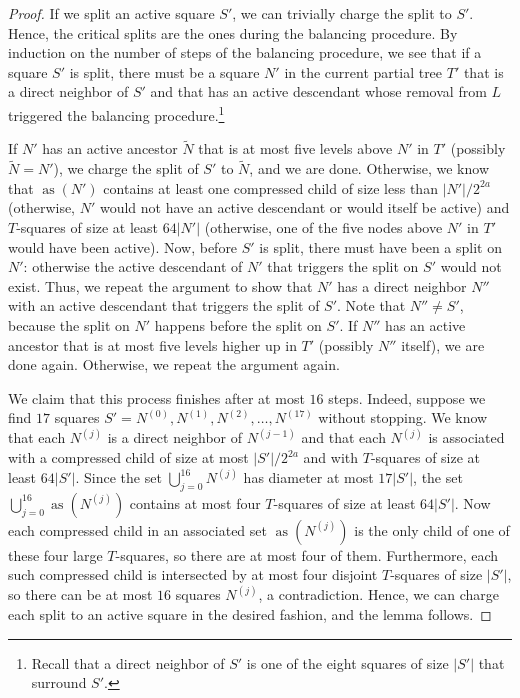 \documentclass[11pt]{paper}
\DeclareMathOperator {\as}{as}
\begin{document}
      \begin{proof}
      If we split an active square $S'$, we can trivially
      charge the split to $S'$.
      Hence, the critical splits
      are the ones during the balancing procedure. 
      By induction on the number of steps of the balancing
      procedure, we see that if a square $S'$ is split, there must be 
      a square $N'$ in the current partial tree $T'$ that is a direct 
      neighbor of $S'$ and that has an active descendant whose 
      removal from $L$  triggered the
      balancing procedure.\footnote{Recall that a direct neighbor
      of $S'$ is one of the eight squares of size $|S'|$ that surround
      $S'$.}

      If $N'$ has an active ancestor $\widetilde{N}$ that is at 
      most five levels above $N'$ in $T'$ (possibly $\widetilde{N} = N'$), 
      we charge the split of $S'$ to
      $\widetilde{N}$, and we are done. Otherwise, we know that
      $\as(N')$ contains at least one compressed child of
      size less than $|N'|/2^{2a}$ (otherwise, $N'$ would not
      have an active descendant or would itself be active) 
      and $T$-squares of size at least
      $64|N'|$ (otherwise, one of the five nodes above $N'$ in $T'$ 
      would have been active). Now, before $S'$ is split, there
      must have been a split on $N'$: otherwise the
      active descendant of $N'$ that triggers
      the split on $S'$ would not exist. Thus, we repeat the argument to show
      that $N'$ has a direct neighbor $N''$ with an
      active descendant that triggers the split of $S'$. 
      Note that $N'' \neq S'$, because the split on $N'$ happens before
      the split on $S'$.
      If $N''$ has an active ancestor that is at most five levels higher up in
      $T'$ (possibly $N''$ itself), we are done again. 
      Otherwise, we repeat the argument again. 
      
      We claim that this process finishes after at most $16$ steps. 
      Indeed, suppose we find $17$ squares 
      $S' = N^{(0)}, N^{(1)}, N^{(2)}, \ldots, N^{(17)}$ without stopping. 
      We know that each $N^{(j)}$ is a direct neighbor of $N^{(j-1)}$ and that
      each $N^{(j)}$ is associated with a compressed child of size
      at most $|S'|/2^{2a}$ and with $T$-squares of size at least
      $64|S'|$. Since the set $\bigcup_{j=0}^{16} N^{(j)}$ has
      diameter at most $17|S'|$, the set $\bigcup_{j=0}^{16} \as(N^{(j)})$
      contains at most four $T$-squares of size at least $64|S'|$.
      Now each compressed child in an associated set
      $\as(N^{(j)})$ is the only child of one of these four large $T$-squares,
      so there are at most four of them.
      Furthermore, each such compressed child is intersected by at
      most four disjoint $T$-squares of size $|S'|$, so 
      there can be at most $16$ squares $N^{(j)}$, a contradiction.
      Hence, we can charge each split to an active square in the
      desired fashion, and the lemma follows.
      \end{proof}
       
\end{document}
